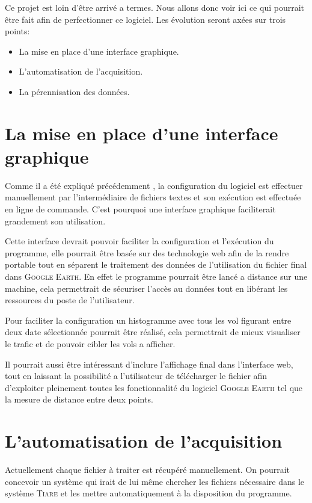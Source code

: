 Ce projet est loin d'être arrivé a termes. Nous allons donc voir ici ce qui pourrait être fait afin de perfectionner ce logiciel. Les évolution seront axées sur trois points:
\begin{itemize}
    \item La mise en place d'une interface graphique.
    \item L'automatisation de l'acquisition.
    \item La pérennisation des données.
\end{itemize}

\section{La mise en place d'une interface graphique}
Comme il a été expliqué précédemment , la configuration du logiciel est effectuer manuellement par l'intermédiaire de fichiers textes et son exécution est effectuée en ligne de commande. C'est pourquoi une interface graphique faciliterait grandement son utilisation.

Cette interface devrait pouvoir faciliter la configuration et l'exécution du programme, elle pourrait être basée sur des technologie web afin de la rendre portable tout en séparent le traitement des données de l'utilisation du fichier final dans \textsc{Google Earth}. En effet le programme pourrait être lancé a distance sur une machine, cela permettrait de sécuriser l'accès au données tout en libérant les ressources du poste de l'utilisateur.

Pour faciliter la configuration un histogramme avec tous les vol figurant entre deux date sélectionnée pourrait être réalisé, cela permettrait de mieux visualiser le trafic et de pouvoir cibler les vols a afficher.

Il pourrait aussi être intéressant d'inclure l'affichage final dans l'interface web, tout en laissant la possibilité a l'utilisateur de télécharger le fichier afin d'exploiter pleinement toutes les fonctionnalité du logiciel \textsc{Google Earth} tel que la mesure de distance entre deux points.

\section{L'automatisation de l'acquisition}
Actuellement chaque fichier à traiter est récupéré manuellement. On pourrait concevoir un système qui irait de lui même chercher les fichiers nécessaire dans le système \textsc{Tiare} et les mettre automatiquement à la disposition du programme.

